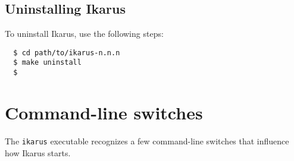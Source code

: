 \documentclass[onecolumn, 12pt, twoside, openright, dvipdfm]{book}
\begin{document}
\subsection{Uninstalling Ikarus}

To uninstall Ikarus, use the following steps:

\begin{verbatim}
  $ cd path/to/ikarus-n.n.n
  $ make uninstall
  $
\end{verbatim}


\section{Command-line switches}

The \texttt{ikarus} executable recognizes a few command-line
switches that influence how Ikarus starts.
\end{document}
